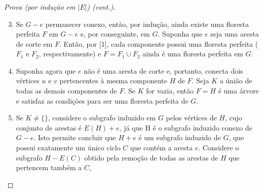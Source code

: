 \documentclass{beamer}
\begin{document}
\begin{frame}
    \frametitle{}

    \begin{proof}[Prova (por indução em $|E|$) (cont.)]
        \begin{enumerate}
            \setcounter{enumi}{2}
            \item Se $G - e$ permanecer conexo, então, por indução, ainda existe uma floresta perfeita $F$ em $G - e$ e, por conseguinte, em $G$. Suponha que $e$ seja uma aresta de corte em $F$. Então, por [1], cada componente possui uma floresta perfeita ($F_{1}$ e $F_{2}$, respectivamente) e $F = F_{1} \cup F_{2}$ ainda é uma floresta perfeita em $G$.
            \item Suponha agora que $e$ não é uma aresta de corte e, portanto, conecta dois vértices $u$ e $v$ pertencentes à mesma componente $H$ de $F$. Seja $K$ a únião de todas as demais componentes de $F$. Se $K$ for vazia, então $F = H$ é uma árvore e satisfaz as condições para ser uma floresta perfeita de $G$.
            \item Se $K \neq \{\}$, considere o subgrafo induzido em $G$ pelos vértices de $H$, cujo conjunto de arestas é $E(H) + e$, já que H é o subgrafo induzido conexo de $G - e$. Isto permite concluir que $H + e$ é um subgrafo induzido de $G$, que possui exatamente um único ciclo $C$ que contém a aresta $e$. Considere o subgrafo $H - E(C)$ obtido pela remoção de todas as arestas de $H$ que pertencem também a $C$, 
        \end{enumerate}
    \end{proof}

\end{frame}



\end{document}
